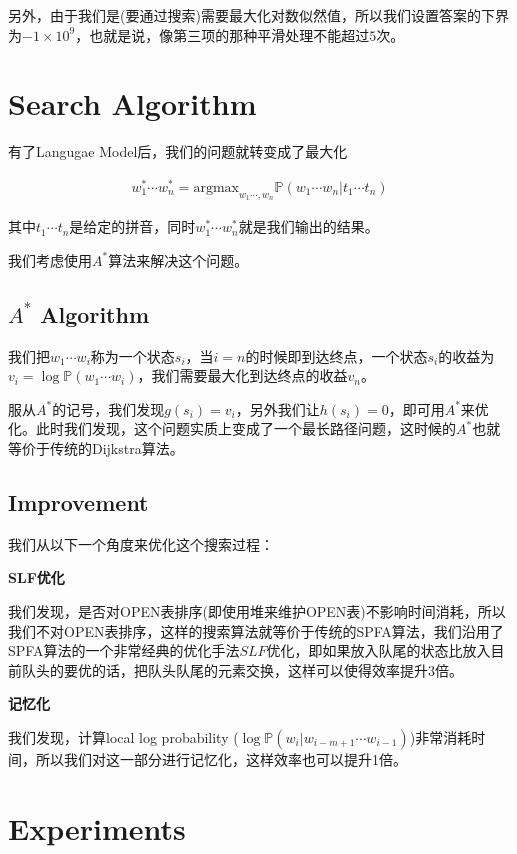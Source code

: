\documentclass{article}
\begin{document}
另外，由于我们是(要通过搜索)需要最大化对数似然值，所以我们设置答案的下界为$-1\times 10^9$，也就是说，像第三项的那种平滑处理不能超过$5$次。

\section{Search Algorithm}

有了Langugae Model后，我们的问题就转变成了最大化

\begin{eqnarray}
	w_1^*\cdots w_n^* = \mathrm{argmax}_{w_1\cdots, w_n} \mathbb{P}(w_1\cdots w_n\lvert t_1 \cdots t_n)
\end{eqnarray}

其中$t_1 \cdots t_n$是给定的拼音，同时$w_1^*\cdots w_n^*$就是我们输出的结果。

我们考虑使用$A^*$算法来解决这个问题。

\subsection{$A^*$ Algorithm}

我们把$w_1\cdots w_i$称为一个状态$s_i$，当$i=n$的时候即到达终点，一个状态$s_i$的收益为$v_i = \log \mathbb{P}(w_1\cdots w_i)$，我们需要最大化到达终点的收益$v_n$。

服从$A^*$的记号，我们发现$g(s_i)=v_i$，另外我们让$h(s_i)=0$，即可用$A^*$来优化。此时我们发现，这个问题实质上变成了一个最长路径问题，这时候的$A^*$也就等价于传统的Dijkstra算法。

\subsection{Improvement}

我们从以下一个角度来优化这个搜索过程：

\noindent \textbf{SLF优化}

我们发现，是否对OPEN表排序(即使用堆来维护OPEN表)不影响时间消耗，所以我们不对OPEN表排序，这样的搜索算法就等价于传统的SPFA算法，我们沿用了SPFA算法的一个非常经典的优化手法$SLF$优化，即如果放入队尾的状态比放入目前队头的要优的话，把队头队尾的元素交换，这样可以使得效率提升3倍。

\noindent \textbf{记忆化}

我们发现，计算local log probability ($\log\mathbb{P}(w_i\lvert w_{i-m+1}\cdots w_{i-1})$)非常消耗时间，所以我们对这一部分进行记忆化，这样效率也可以提升1倍。

\section{Experiments}
\end{document}
